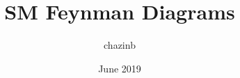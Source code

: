 \documentclass{article}
\title{SM Feynman Diagrams}
\author{chazinb}
\date{June 2019}
\begin{document}
\newcommand{\keyword}[1]{\textbf{#1}}
\newcommand{\tabhead}[1]{\textbf{#1}}
\newcommand{\code}[1]{\texttt{#1}}
\newcommand{\file}[1]{\texttt{\bfseries#1}}
\newcommand{\option}[1]{\texttt{\itshape#1}}
\setlength{\parskip}{3mm}


\maketitle

%
\clearpage
%
\clearpage

\clearpage
%
\clearpage
%
\clearpage
%
\clearpage
%
\clearpage
%
\end{document}
